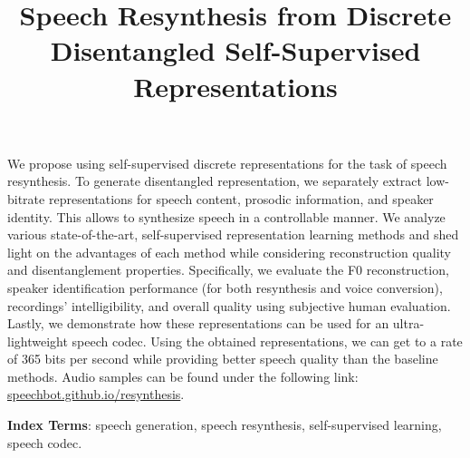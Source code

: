 \documentclass[a4paper]{article}
\title{Speech Resynthesis from Discrete \\ Disentangled Self-Supervised Representations}
\begin{document}
\maketitle

\begin{abstract}
\end{abstract}
We propose using self-supervised discrete representations for the task of speech resynthesis. To generate disentangled representation, we separately extract low-bitrate representations for speech content, prosodic information, and speaker identity. This allows to synthesize speech in a controllable manner. We analyze various state-of-the-art, self-supervised representation learning methods and shed light on the advantages of each method while considering reconstruction quality and disentanglement properties. Specifically, we evaluate the F0 reconstruction, speaker identification performance (for both resynthesis and voice conversion), recordings' intelligibility, and overall quality using subjective human evaluation. Lastly, we demonstrate how these representations can be used for an ultra-lightweight speech codec. Using the obtained representations, we can get to a rate of 365 bits per second while providing better speech quality than the baseline methods. Audio samples can be found under the following link: {\color{magenta} \url{speechbot.github.io/resynthesis}}.

\noindent\textbf{Index Terms}: speech generation, speech resynthesis, self-supervised learning, speech codec.









\end{document}
